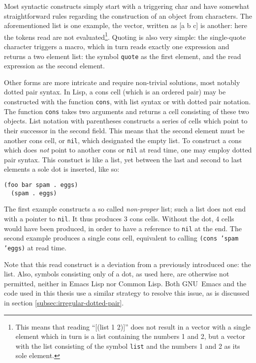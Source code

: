 \documentclass[a4paper,10pt,twoside]{report}
\newcommand{\el}{Emacs Lisp}
\newcommand{\cl}{Common Lisp}
\newcommand{\sym}[1]{\texttt{#1}}
\newcommand{\fun}[1]{\texttt{#1}}
\newcommand{\emacs}{GNU~Emacs}
\newcommand{\nil}{\sym{nil}}
\begin{document}
Most syntactic constructs simply start with a triggering char and have somewhat
straightforward rules regarding the construction of an object from characters.
The aforementioned list is one example, the vector, written as [a b c] is
another: here the tokens read are not evaluated\footnote{This means that reading
``[(list 1 2)]'' does not result in a vector with a single element which in turn
is a list containing the numbers 1 and 2, but a vector with the list consisting
of the symbol \sym{list} and the numbers 1 and 2 as its sole element.}.  Quoting
is also very simple: the single-quote character triggers a macro, which in turn
reads exactly one expression and returns a two element list: the symbol
\sym{quote} as the first element, and the read expression as the second element.

Other forms are more intricate and require non-trivial solutions, most notably
dotted pair syntax.  In Lisp, a cons cell (which is an ordered pair) may be
constructed with the function \fun{cons}, with list syntax or with dotted pair
notation.  The function \fun{cons} takes two arguments and returns a cell
consisting of these two objects.  List notation with parentheses constructs a
series of cells which point to their successor in the second field.  This means
that the second element must be another cons cell, or \nil{}, which designated the
empty list.  To construct a cons which does \emph{not} point to another cons or
\nil{} at read time, one may employ dotted pair syntax.  This constuct is like a
list, yet between the last and second to last elements a sole dot is inserted,
like so:

\begin{lstlisting}[style=lispinline]
  (foo bar spam . eggs)
  (spam . eggs)
\end{lstlisting}

The first example constructs a so called \emph{non-proper} list; such a list
does not end with a pointer to \nil{}.  It thus produces 3 cons cells.  Without
the dot, 4 cells would have been produced, in order to have a reference to
\nil{} at the end.  The second example produces a single cons cell, equivalent
to calling \texttt{(cons 'spam 'eggs)} at read time.

Note that this read construct is a deviation from a previously introduced one:
the list.  Also, symbols consisting only of a dot, as used here, are otherwise
not permitted, neither in \el{} nor \cl{}.  Both \emacs{} and the code used in
this thesis use a similar strategy to resolve this issue, as is discussed in
section \ref{subsec:irregular-dotted-pair}.
\end{document}
